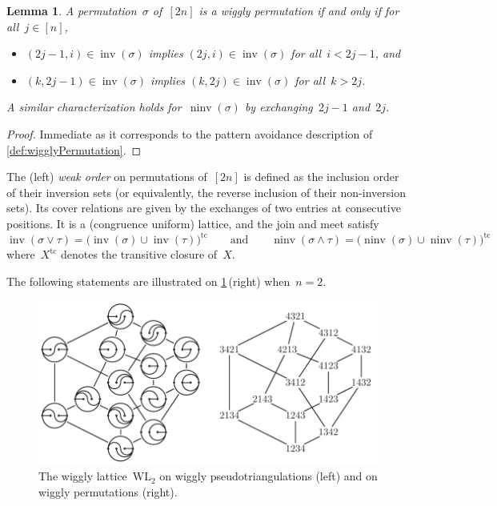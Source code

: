 \documentclass{amsart}
\newtheorem{lemma}[theorem]{Lemma}
\theoremstyle{definition}
\DeclareMathOperator{\inv}{inv} %
\DeclareMathOperator{\ninv}{ninv} %
\newcommand{\darkblue}{\color{darkblue}} %
\newcommand{\defn}[1]{\textsl{\darkblue #1}} %
\newcommand{\meet}{\wedge} %
\newcommand{\join}{\vee} %
\newcommand{\wigglyLattice}{\mathrm{WL}} %
\begin{document}
\begin{lemma}
\label{lem:inversionSetsWigglyPermutations}
A permutation~$\sigma$ of~$[2n]$ is a wiggly permutation if and only if for all~$j \in [n]$,
\begin{itemize}
\item $(2j-1, i) \in \inv(\sigma)$ implies $(2j, i) \in \inv(\sigma)$ for all~$i < 2j-1$, and
\item $(k, 2j-1) \in \inv(\sigma)$ implies $(k, 2j) \in \inv(\sigma)$ for all~$k > 2j$.
\end{itemize}
A similar characterization holds for~$\ninv(\sigma)$ by exchanging~$2j-1$ and~$2j$.
\end{lemma}

\begin{proof}
Immediate as it corresponds to the pattern avoidance description of \cref{def:wigglyPermutation}.
\end{proof}

The (left) \defn{weak order} on permutations of~$[2n]$ is defined as the inclusion order of their inversion sets (or equivalently, the reverse inclusion of their non-inversion sets).
Its cover relations are given by the exchanges of two entries at consecutive positions.
It is a (congruence uniform) lattice, and the join and meet satisfy
\[
\inv(\sigma \join \tau) = \big( \inv(\sigma) \cup \inv(\tau) \big)^\textrm{tc}
\qquad\text{and}\qquad
\ninv(\sigma \meet \tau) = \big( \ninv(\sigma) \cup \ninv(\tau) \big)^\textrm{tc}
\]
where~$X^\mathrm{tc}$ denotes the transitive closure of~$X$.

The following statements are illustrated on \cref{fig:wigglyLattice}\,(right) when~${n = 2}$.
%
\begin{figure}
\centerline{\includegraphics[scale=1.1]{wigglyLattice}}
\caption{The wiggly lattice~$\wigglyLattice_2$ on wiggly pseudotriangulations (left) and on wiggly permutations (right).}
\label{fig:wigglyLattice}
\end{figure}
\end{document}
